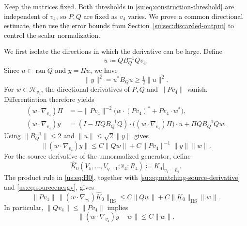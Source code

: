 \documentclass[11pt]{article}
\numberwithin{equation}{section}
\theoremstyle{remark}
\newcommand{\ran}{\operatorname{ran}}
\newcommand{\HS}{\mathrm{HS}}
\begin{document}
Keep the matrices fixed. Both thresholds in
\eqref{su:eq:construction-threshold} are independent of $v_4$, so
$P,Q$ are fixed as $v_4$ varies. We prove a common directional estimate,
then use the error bounds from Section~\ref{su:sec:discarded-output}
to control the scalar normalization.

We first isolate the directions in which the derivative can be large. Define
\[
 u\coloneqq QB_Q^{-1}Qv_4.
\]
Since $u\in\ran Q$ and $y=\Pi u$, we have
\[
 \|y\|^2=u^*B_Qu\ge\tfrac12\|u\|^2.
\]
For $w\in\mathcal H_{v_4}$, the directional derivatives of $P,Q$ and
$\|Pv_4\|$ vanish. Differentiation therefore yields
\[
 \begin{aligned}
  (w\cdot\nabla_{v_4})\Pi
   &=-\|Pv_4\|^{-2}\bigl(w\cdot(Pv_4)^*+Pv_4\cdot w^*\bigr),\\
  (w\cdot\nabla_{v_4})y
   &=(I-\Pi QB_Q^{-1}Q)\cdot\bigl((w\cdot\nabla_{v_4})\Pi\bigr)\cdot u
      +\Pi QB_Q^{-1}Qw.
 \end{aligned}
\]
Using $\|B_Q^{-1}\|\le2$ and $\|u\|\le\sqrt2\|y\|$ gives
\begin{equation}\label{su:eq:matching-source-derivative}
 \|(w\cdot\nabla_{v_4})y\|
 \le C\|Qw\|+C\|Pv_4\|^{-1} \|y\|\|w\|.
\end{equation}
For the source derivative of the unnormalized generator, define
\[
 \widehat K_0(V_5,\ldots,V_{q-1};\widehat v_4;R_4)
 \coloneqq\left.K_0\right|_{v_4=\widehat v_4}.
\]
The product rule in \eqref{us:eq:H0}, together with
\eqref{su:eq:matching-source-derivative} and \eqref{us:eq:sourceenergy}, gives
\begin{equation}\label{su:eq:unnormalized-source-response}
 \|Pv_4\|\,\|(w\cdot\nabla_{v_4})\widehat K_0\|_{\HS}
 \le C\|Qw\|+C\|K_0\|_{\HS}\|w\|.
\end{equation}
In particular, $\|Qv_4\|\le\|Pv_4\|$ implies
\begin{equation}\label{su:eq:matching-error-derivative}
 \|(w\cdot\nabla_{v_4})y-w\|\le C\|w\|.
\end{equation}
\end{document}
